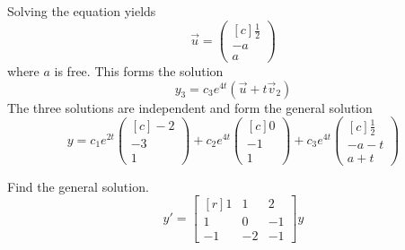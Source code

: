 \documentclass[11pt, titlepage]{article}
\begin{document}
\begin{solution}
    Solving the equation yields
    \begin{equation*}
      \vec{u} =
      \begin{pmatrix*}[c]
        \frac{1}{2} \\
        -a \\
        a
      \end{pmatrix*}
    \end{equation*}
    where \(a\) is free. This forms the solution
    \begin{equation*}
      y_{3} = c_{3} e^{4t} (\vec{u} + t \vec{v}_{2})
    \end{equation*}
    The three solutions are independent and form the general solution
    \begin{equation*}
      y = c_{1} e^{2t}
      \begin{pmatrix*}[c]
        -2 \\
        -3 \\
        1
      \end{pmatrix*} +
      c_{2} e^{4t}
      \begin{pmatrix*}[c]
        0 \\
        -1 \\
        1
      \end{pmatrix*} +
      c_{3} e^{4t}
      \begin{pmatrix*}[c]
        \frac{1}{2} \\
        -a - t \\
        a + t
      \end{pmatrix*}
    \end{equation*}
  \end{solution}

  \pagebreak

  \begin{problem}[Trench 10.6.13]
    Find the general solution.
    \begin{equation*}
      y' =
      \begin{bmatrix*}[r]
        1 & 1 & 2 \\
        1 & 0 & -1 \\
        -1 & -2 & -1
      \end{bmatrix*} y
    \end{equation*}
  \end{problem}
\end{document}
